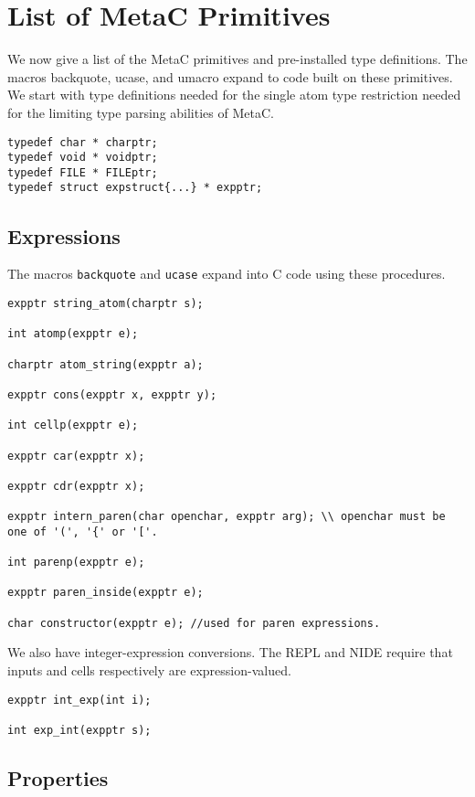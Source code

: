 \documentclass{article}
\begin{document}
\section{List of MetaC Primitives}

We now give a list of the MetaC primitives and pre-installed type definitions.  The macros backquote, ucase, and umacro expand to code built on these primitives.
We start with type definitions needed for the single atom type restriction needed for the limiting type parsing abilities of MetaC.

\begin{verbatim}
typedef char * charptr;
typedef void * voidptr;
typedef FILE * FILEptr;
typedef struct expstruct{...} * expptr;
\end{verbatim}

\subsection{Expressions}

The macros {\tt backquote} and {\tt ucase} expand into C code using these procedures.

\begin{verbatim}
expptr string_atom(charptr s);

int atomp(expptr e);

charptr atom_string(expptr a);

expptr cons(expptr x, expptr y);

int cellp(expptr e);

expptr car(expptr x);

expptr cdr(expptr x);

expptr intern_paren(char openchar, expptr arg); \\ openchar must be one of '(', '{' or '['.

int parenp(expptr e);

expptr paren_inside(expptr e);

char constructor(expptr e); //used for paren expressions.
\end{verbatim}

We also have integer-expression conversions.  The REPL and NIDE require that inputs and cells respectively are expression-valued.

\begin{verbatim}
expptr int_exp(int i);

int exp_int(expptr s);
\end{verbatim}

\subsection{Properties}
\end{document}
